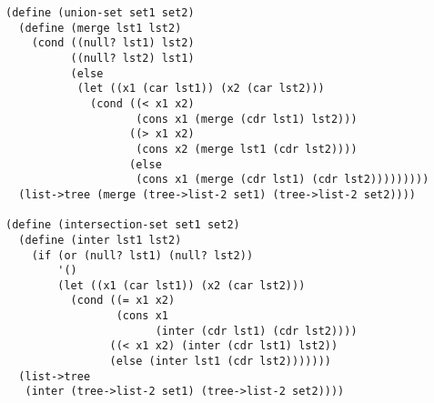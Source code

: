 \documentclass[a4paper,12pt]{article}
\begin{document}
\begin{lstlisting}
(define (union-set set1 set2)
  (define (merge lst1 lst2)
    (cond ((null? lst1) lst2)
          ((null? lst2) lst1)
          (else
           (let ((x1 (car lst1)) (x2 (car lst2)))
             (cond ((< x1 x2)
                    (cons x1 (merge (cdr lst1) lst2)))
                   ((> x1 x2)
                    (cons x2 (merge lst1 (cdr lst2))))
                   (else
                    (cons x1 (merge (cdr lst1) (cdr lst2)))))))))
  (list->tree (merge (tree->list-2 set1) (tree->list-2 set2))))

(define (intersection-set set1 set2)
  (define (inter lst1 lst2)
    (if (or (null? lst1) (null? lst2))
        '()
        (let ((x1 (car lst1)) (x2 (car lst2)))
          (cond ((= x1 x2)
                 (cons x1
                       (inter (cdr lst1) (cdr lst2))))
                ((< x1 x2) (inter (cdr lst1) lst2))
                (else (inter lst1 (cdr lst2)))))))
  (list->tree
   (inter (tree->list-2 set1) (tree->list-2 set2))))
\end{lstlisting}
\end{document}
